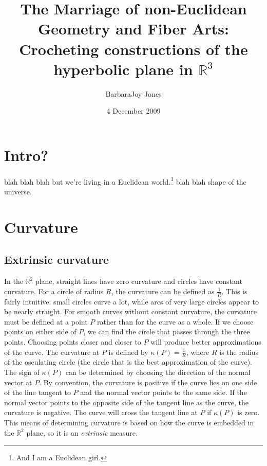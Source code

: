 \documentclass{article}
\title{The Marriage of non-Euclidean Geometry and Fiber Arts:\\
\bigskip
\Large{Crocheting constructions of the hyperbolic plane in $\mathbb{R}^3$}}
\author{BarbaraJoy Jones}
\date{4 December 2009}
\begin{document}
\begin{titlepage}
\maketitle
\end{titlepage}

\section{Intro?}
blah blah blah but we're living in a Euclidean world.\footnote{And I am a Euclidean girl.\cite{madonna}} blah blah shape of the universe.

\section{Curvature}
\subsection{Extrinsic curvature}
In the $\mathbb{R}^2$ plane, straight lines have zero curvature and circles have constant curvature.
For a circle of radius $R$, the curvature can be defined as $\frac{1}{R}$.
This is fairly intuitive: small circles curve a lot, while arcs of very large circles appear to be nearly straight.\cite{adventures}
For smooth curves without constant curvature, the curvature must be defined at a point $P$ rather than for the curve as a whole.
If we choose points on either side of $P$, we can find the circle that passes through the three points.
Choosing points closer and closer to $P$ will produce better approximations of the curve.
The curvature at $P$ is defined by $\kappa(P) = \frac{1}{R}$, where $R$ is the radius of the osculating circle (the circle that is the best approximation of the curve).
The sign of $\kappa(P)$ can be determined by choosing the direction of the normal vector at $P$.
By convention, the curvature is positive if the curve lies on one side of the line tangent to $P$ and the normal vector points to the same side.
If the normal vector points to the opposite side of the tangent line as the curve, the curvature is negative.
The curve will cross the tangent line at $P$ if $\kappa(P)$ is zero.\cite{singer}
This means of determining curvature is based on how the curve is embedded in the $\mathbb{R}^2$ plane, so it is an \emph{extrinsic} measure.
\end{document}
